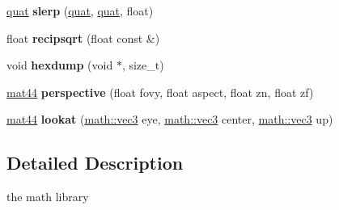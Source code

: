 \begin{DoxyCompactItemize}
\item 
\hypertarget{namespacemath_a33ac1b1153a2dcbc471ea6a4a7a06454}{
\hyperlink{classmath_1_1quat}{quat} {\bfseries slerp} (\hyperlink{classmath_1_1quat}{quat}, \hyperlink{classmath_1_1quat}{quat}, float)}
\label{namespacemath_a33ac1b1153a2dcbc471ea6a4a7a06454}

\item 
\hypertarget{namespacemath_aab0f4b6e5450449993509452ec3f5346}{
float {\bfseries recipsqrt} (float const \&)}
\label{namespacemath_aab0f4b6e5450449993509452ec3f5346}

\item 
\hypertarget{namespacemath_ae4ed1a3349ed01004dec19f19339135e}{
void {\bfseries hexdump} (void $\ast$, size\_\-t)}
\label{namespacemath_ae4ed1a3349ed01004dec19f19339135e}

\item 
\hypertarget{namespacemath_a41c77dfe60e0610f09beaca0bfaecca5}{
\hyperlink{classmath_1_1mat44}{mat44} {\bfseries perspective} (float fovy, float aspect, float zn, float zf)}
\label{namespacemath_a41c77dfe60e0610f09beaca0bfaecca5}

\item 
\hypertarget{namespacemath_ae24b1d47e947a21a2677c89b8ef0ea23}{
\hyperlink{classmath_1_1mat44}{mat44} {\bfseries lookat} (\hyperlink{classmath_1_1vec3}{math::vec3} eye, \hyperlink{classmath_1_1vec3}{math::vec3} center, \hyperlink{classmath_1_1vec3}{math::vec3} up)}
\label{namespacemath_ae24b1d47e947a21a2677c89b8ef0ea23}

\end{DoxyCompactItemize}


\subsection{Detailed Description}
the math library 
